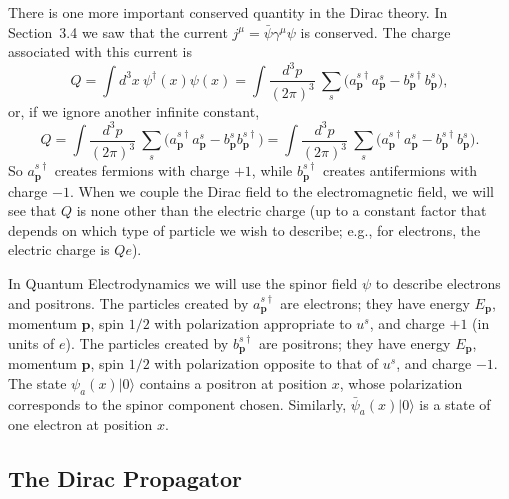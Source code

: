 There is one more important conserved quantity in the Dirac theory.  In
Section~3.4 we saw that the current $j^\mu = \bar{\psi}\gamma^\mu\psi$ is
conserved.  The charge associated with this current is
\begin{equation}
  Q = \int d^3x\ \psi^\dagger(x)\psi(x)
    = \int \frac{d^3p}{(2\pi)^3}\ \sum_s
      \bigl( a_{\mathbf{p}}^{s\dagger}a_{\mathbf{p}}^s
        - b_{\mathbf{p}}^{s\dagger}b_{\mathbf{p}}^s \bigr),
  \label{eq:3.113}
\end{equation}
or, if we ignore another infinite constant,
\begin{equation}
  Q = \int \frac{d^3p}{(2\pi)^3}\ \sum_s
    \bigl( a_{\mathbf{p}}^{s\dagger}a_{\mathbf{p}}^s
      - b_{\mathbf{p}}^s b_{\mathbf{p}}^{s\dagger} \bigr)
    = \int \frac{d^3p}{(2\pi)^3}\ \sum_s
      \bigl( a_{\mathbf{p}}^{s\dagger}a_{\mathbf{p}}^s
        - b_{\mathbf{p}}^{s\dagger}b_{\mathbf{p}}^s \bigr).
  \label{eq:3.114}
\end{equation}
So $a_{\mathbf{p}}^{s\dagger}$ creates fermions with charge $+1$, while
$b_{\mathbf{p}}^{s\dagger}$ creates antifermions with charge $-1$.  When we
couple the Dirac field to the electromagnetic field, we will see that $Q$ is
none other than the electric charge (up to a constant factor that depends on
which type of particle we wish to describe; e.g., for electrons, the electric
charge is $Qe$).

In Quantum Electrodynamics we will use the spinor field $\psi$ to describe
electrons and positrons.  The particles created by $a_{\mathbf{p}}^{s\dagger}$
are electrons; they have energy $E_{\mathbf{p}}$, momentum $\mathbf{p}$, spin
$1/2$ with polarization appropriate to $u^s$, and charge $+1$ (in units of
$e$).  The particles created by $b_{\mathbf{p}}^{s\dagger}$ are positrons;
they have energy $E_{\mathbf{p}}$, momentum $\mathbf{p}$, spin $1/2$ with
polarization opposite to that of $u^s$, and charge $-1$.  The state
$\psi_a(x)|0\rangle$ contains a positron at position $x$, whose polarization
corresponds to the spinor component chosen.  Similarly, $\bar{\psi}_a(x)|0\rangle$
is a state of one electron at position $x$.

\subsection{The Dirac Propagator}

